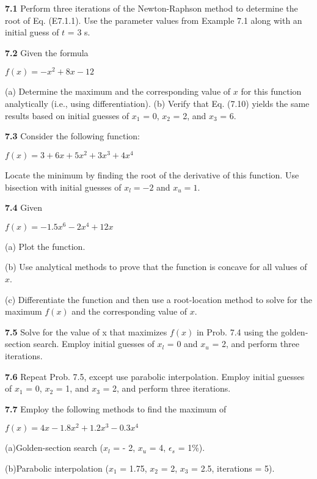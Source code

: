 \documentclass[../main.tex]{subfiles}
\begin{document}
\begin{multicols}{2}
	\noindent\textbf{7.1} Perform three iterations of the Newton-Raphson method
	to determine the root of Eq. (E7.1.1). Use the parameter values
	from Example 7.1 along with an initial guess of $t$ = 3 s.

	\noindent\textbf{7.2} Given the formula

	\noindent $f(x) = -x^2 + 8x - 12$

	\noindent(a) Determine the maximum and the corresponding value of
	$x$ for this function analytically (i.e., using differentiation).
	(b) Verify that Eq. (7.10) yields the same results based on
	initial guesses of $x_1$ = 0, $x_2$ = 2, and $x_3$ = 6.

	\noindent\textbf{7.3} Consider the following function:

	\noindent$f(x) = 3 + 6x + 5x^2 + 3x^3 + 4x^4$

	\noindent Locate the minimum by finding the root of the derivative of
	this function. Use bisection with initial guesses of $x_l= -2$ and $x_u = 1$.

	\noindent\textbf{7.4} Given

	\noindent$f(x) = -1.5x^6 - 2x^4 + 12x$

	\noindent  (a) Plot the function.

	\noindent(b) Use analytical methods to prove that the function is concave
	for all values of $x$.

	\noindent(c) Differentiate the function and then use a root-location
	method to solve for the maximum $f(x)$ and the corresponding value of $x$.

	\noindent\textbf{7.5} Solve for the value of x that maximizes $f(x)$ in Prob. 7.4
	using the golden-section search. Employ initial guesses of $x_l$ = 0 and $x_u$ = 2, 
	and perform three iterations.

	\noindent\textbf{7.6} Repeat Prob. 7.5, except use parabolic interpolation.
	Employ initial guesses of $x_1$ = 0, $x_2$ = 1, and $x_3$ = 2, and perform three iterations.

	\noindent\textbf{7.7} Employ the following methods to find the maximum of

	\noindent $f (x) = 4x - 1.8x^2 + 1.2x^3 - 0.3x^4$

	\noindent(a)Golden-section search ($x_l$ = - 2, $x_u$ = 4, $\epsilon_s$ = 1\%). 

	\noindent(b)Parabolic interpolation ($x_1$ = 1.75, $x_2$ = 2, $x_3$ = 2.5, iterations = 5).


\end{multicols}
\end{document}
